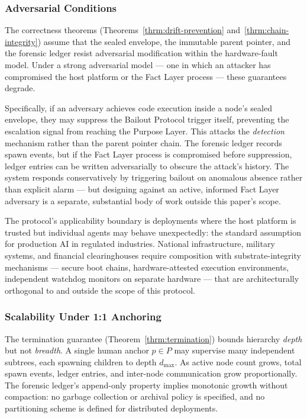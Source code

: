 \subsubsection{Adversarial Conditions}
\label{sec:limitations-adversarial}

The correctness theorems (Theorems~\ref{thrm:drift-prevention} and~\ref{thrm:chain-integrity}) assume that the sealed envelope, the immutable parent pointer, and the forensic ledger resist adversarial modification within the hardware-fault model. Under a strong adversarial model --- one in which an attacker has compromised the host platform or the Fact Layer process --- these guarantees degrade.

Specifically, if an adversary achieves code execution inside a node's sealed envelope, they may suppress the Bailout Protocol trigger itself, preventing the escalation signal from reaching the Purpose Layer. This attacks the \emph{detection} mechanism rather than the parent pointer chain. The forensic ledger records spawn events, but if the Fact Layer process is compromised before suppression, ledger entries can be written adversarially to obscure the attack's history. The system responds conservatively by triggering bailout on anomalous absence rather than explicit alarm --- but designing against an active, informed Fact Layer adversary is a separate, substantial body of work outside this paper's scope.

The protocol's applicability boundary is deployments where the host platform is trusted but individual agents may behave unexpectedly: the standard assumption for production AI in regulated industries. National infrastructure, military systems, and financial clearinghouses require composition with substrate-integrity mechanisms --- secure boot chains, hardware-attested execution environments, independent watchdog monitors on separate hardware --- that are architecturally orthogonal to and outside the scope of this protocol.

\subsubsection{Scalability Under 1:1 Anchoring}
\label{sec:limitations-scalability}

The termination guarantee (Theorem~\ref{thrm:termination}) bounds hierarchy \emph{depth} but not \emph{breadth}. A single human anchor $p \in P$ may supervise many independent subtrees, each spawning children to depth $d_{\max}$. As active node count grows, total spawn events, ledger entries, and inter-node communication grow proportionally. The forensic ledger's append-only property implies monotonic growth without compaction: no garbage collection or archival policy is specified, and no partitioning scheme is defined for distributed deployments.

